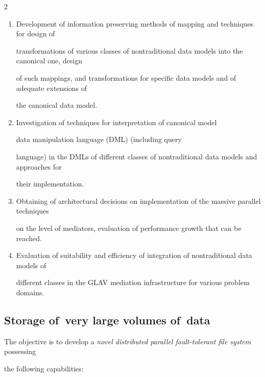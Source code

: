 \begin{multicols}{2}
\noindent


\begin{enumerate}[1.]


\item Development of information preserving methods of mapping and techniques for design of 


transformations of various classes of nontraditional data models into the canonical one, design 


of such mappings, and transformations for specific data models and of adequate extensions of 


the canonical data model.


\item Investigation of techniques for interpretation of canonical model 


data manipulation language (DML) (including query 


language) in the DMLs of different classes of nontraditional data models and approaches for 


their implementation.


\item Obtaining of architectural decisions on implementation of the massive parallel techniques 


on the level of mediators, evaluation of performance growth that can be reached.


\item Evaluation of suitability and efficiency of integration of nontraditional data models of 


different classes in the GLAV mediation infrastructure for various problem domains.


\end{enumerate}





\subsection{Storage of~very large volumes of~data}





\noindent


The objective is to develop a \textit{novel distributed parallel fault-tolerant file system} possessing 


the following capabilities:


\begin{itemize}



\end{itemize}
\end{multicols}
